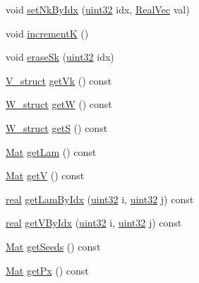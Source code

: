 \begin{DoxyCompactItemize}
\item 
void \mbox{\hyperlink{classvd_aa45da38425cbd5b48f61313323ba6204}{set\+Nk\+By\+Idx}} (\mbox{\hyperlink{typedefs_8cpp_a8ad23e2333787a214e20a58a284a5a60}{uint32}} idx, \mbox{\hyperlink{typedefs_8cpp_a84b6d9a0fbb45e01ad4a3aa5667f2992}{Real\+Vec}} val)
\item 
void \mbox{\hyperlink{classvd_a59c1f5756af7de9cc7a0089221cbd5b7}{incrementK}} ()
\item 
void \mbox{\hyperlink{classvd_ab5a972992406d5c42d1398573d9c769a}{erase\+Sk}} (\mbox{\hyperlink{typedefs_8cpp_a8ad23e2333787a214e20a58a284a5a60}{uint32}} idx)
\item 
\mbox{\hyperlink{structV__struct}{V\+\_\+struct}} \mbox{\hyperlink{classvd_a090bebdbbff36888934c870daf3dcb36}{get\+Vk}} () const
\item 
\mbox{\hyperlink{structW__struct}{W\+\_\+struct}} \mbox{\hyperlink{classvd_ab4d0d9ea76cedf1a6825b62c9ec2d118}{getW}} () const
\item 
\mbox{\hyperlink{structW__struct}{W\+\_\+struct}} \mbox{\hyperlink{classvd_a7f901e0c6d226b81f262c2363a69844a}{getS}} () const
\item 
\mbox{\hyperlink{typedefs_8cpp_a9fa28c1f74e909474857584f5c7b0088}{Mat}} \mbox{\hyperlink{classvd_a37c4ab12669eb276fe7fa4a610310345}{get\+Lam}} () const
\item 
\mbox{\hyperlink{typedefs_8cpp_a9fa28c1f74e909474857584f5c7b0088}{Mat}} \mbox{\hyperlink{classvd_aad4ea5c045b8380f83b0490af2fee0fa}{getV}} () const
\item 
\mbox{\hyperlink{typedefs_8cpp_a58a0c7cf2501f4492da833421be92547}{real}} \mbox{\hyperlink{classvd_a5c26b069f893aa82eeaf53ff608eda1f}{get\+Lam\+By\+Idx}} (\mbox{\hyperlink{typedefs_8cpp_a8ad23e2333787a214e20a58a284a5a60}{uint32}} i, \mbox{\hyperlink{typedefs_8cpp_a8ad23e2333787a214e20a58a284a5a60}{uint32}} j) const
\item 
\mbox{\hyperlink{typedefs_8cpp_a58a0c7cf2501f4492da833421be92547}{real}} \mbox{\hyperlink{classvd_a640ed20e4618abd409e180a707eea3b1}{get\+V\+By\+Idx}} (\mbox{\hyperlink{typedefs_8cpp_a8ad23e2333787a214e20a58a284a5a60}{uint32}} i, \mbox{\hyperlink{typedefs_8cpp_a8ad23e2333787a214e20a58a284a5a60}{uint32}} j) const
\item 
\mbox{\hyperlink{typedefs_8cpp_a9fa28c1f74e909474857584f5c7b0088}{Mat}} \mbox{\hyperlink{classvd_a82f353c594c3c6b24f6077398f059d3a}{get\+Seeds}} () const
\item 
\mbox{\hyperlink{typedefs_8cpp_a9fa28c1f74e909474857584f5c7b0088}{Mat}} \mbox{\hyperlink{classvd_aeba6d318016c8f8b9537ce4c0314f8cd}{get\+Px}} () const

\end{DoxyCompactItemize}
